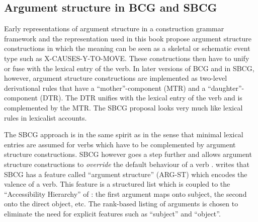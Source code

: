 \subsection{Argument structure in BCG and SBCG}
\label{s:comp-bcg}

Early representations of argument structure in a construction grammar framework \citep[such as][]{goldberg95construction} and the representation used in this book propose argument structure constructions in which the meaning can be seen as a skeletal or schematic event type such as X-CAUSES-Y-TO-MOVE. These constructions then have to unify or fuse with the lexical entry of the verb. In later versions of BCG and in SBCG, however, argument structure constructions are implemented as two-level derivational rules that have a ``mother''-component (MTR) and a ``daughter''-component (DTR). The DTR unifies with the lexical entry of the verb and is complemented by the MTR. The SBCG proposal looks very much like lexical rules in lexicalist accounts.

The SBCG approach is in the same spirit as \citet{goldberg95construction} in the sense that minimal lexical entries are assumed for verbs which have to be complemented by argument structure constructions. SBCG however goes a step further and allows argument structure constructions to {\em override} the default behaviour of a verb \citep{michaelis06complementation, sag07sbcg}. \citet{sag07sbcg} writes that SBCG has a feature called ``argument structure'' (ARG-ST) which encodes the valence of a verb. This feature is a structured list which is coupled to the ``Accessibility Hierarchy'' of \citet{keenan77noun}: the first argument maps onto subject, the second onto the direct object, etc. The rank-based listing of arguments is chosen to eliminate the need for explicit features such as ``subject'' and ``object''.

